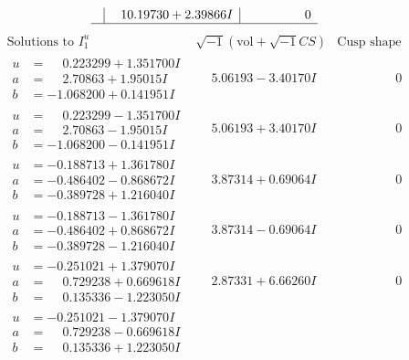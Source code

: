 \documentclass[1p]{elsarticle_modified}
\theoremstyle{definition}
\newcommand{\I}{\sqrt{-1}}
\begin{document}
$$\begin{array}{c|c|c}
 & \phantom{-}10.19730 + 2.39866 I & \phantom{-0.000000 } 0\\
 \hline 
 \end{array}$$\newpage$$\begin{array}{c|c|c}  
\text{Solutions to }I^u_{1}& \I (\text{vol} + \sqrt{-1}CS) & \text{Cusp shape}\\
 \hline 
\begin{aligned}
u &= \phantom{-}0.223299 + 1.351700 I \\
a &= \phantom{-}2.70863 + 1.95015 I \\
b &= -1.068200 + 0.141951 I\end{aligned}
 & \phantom{-}5.06193 - 3.40170 I & \phantom{-0.000000 } 0 \\ \hline\begin{aligned}
u &= \phantom{-}0.223299 - 1.351700 I \\
a &= \phantom{-}2.70863 - 1.95015 I \\
b &= -1.068200 - 0.141951 I\end{aligned}
 & \phantom{-}5.06193 + 3.40170 I & \phantom{-0.000000 } 0 \\ \hline\begin{aligned}
u &= -0.188713 + 1.361780 I \\
a &= -0.486402 - 0.868672 I \\
b &= -0.389728 + 1.216040 I\end{aligned}
 & \phantom{-}3.87314 + 0.69064 I & \phantom{-0.000000 } 0 \\ \hline\begin{aligned}
u &= -0.188713 - 1.361780 I \\
a &= -0.486402 + 0.868672 I \\
b &= -0.389728 - 1.216040 I\end{aligned}
 & \phantom{-}3.87314 - 0.69064 I & \phantom{-0.000000 } 0 \\ \hline\begin{aligned}
u &= -0.251021 + 1.379070 I \\
a &= \phantom{-}0.729238 + 0.669618 I \\
b &= \phantom{-}0.135336 - 1.223050 I\end{aligned}
 & \phantom{-}2.87331 + 6.66260 I & \phantom{-0.000000 } 0 \\ \hline\begin{aligned}
u &= -0.251021 - 1.379070 I \\
a &= \phantom{-}0.729238 - 0.669618 I \\
b &= \phantom{-}0.135336 + 1.223050 I\end{aligned}

\end{array}$$
\end{document}
